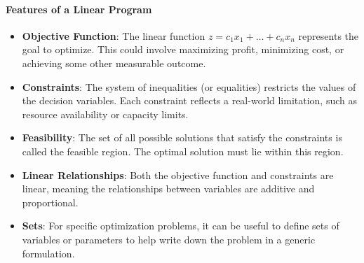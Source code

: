 \paragraph{Features of a Linear Program}

\begin{itemize}
    \item \textbf{Objective Function}: The linear function $z = c_1x_1 + \dots + c_nx_n$ represents the goal to optimize. This could involve maximizing profit, minimizing cost, or achieving some other measurable outcome.
    \item \textbf{Constraints}: The system of inequalities (or equalities) restricts the values of the decision variables. Each constraint reflects a real-world limitation, such as resource availability or capacity limits.
    \item \textbf{Feasibility}: The set of all possible solutions that satisfy the constraints is called the feasible region. The optimal solution must lie within this region.
    \item \textbf{Linear Relationships}: Both the objective function and constraints are linear, meaning the relationships between variables are additive and proportional.
    \item \textbf{Sets}: For specific optimization problems, it can be useful to define sets of variables or parameters to help write down the problem in a generic formulation.
\end{itemize}

